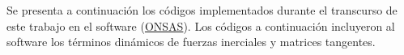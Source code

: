\chapter{}\label{Ape1}

Se presenta a continuación los códigos implementados durante el transcurso de este trabajo en el software (\href{https://github.com/ONSAS/ONSAS.m/}{ONSAS}). Los códigos a continuación incluyeron al software los términos dinámicos de fuerzas inerciales y matrices tangentes. 


%
